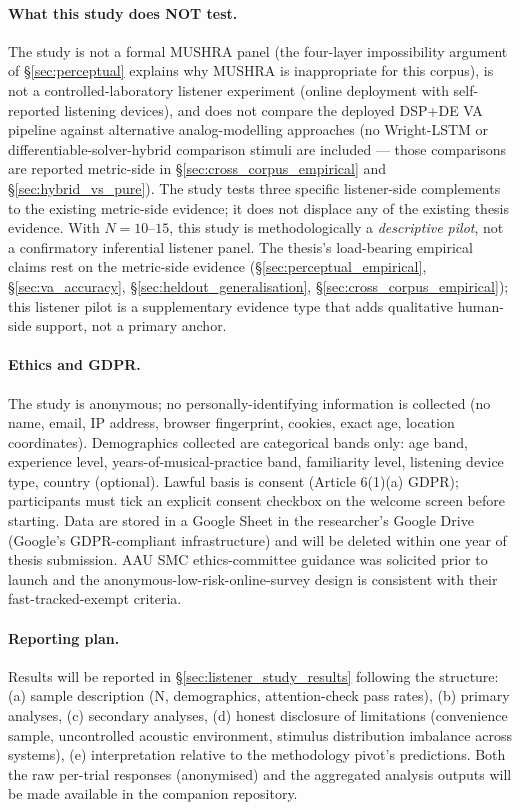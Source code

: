\paragraph{What this study does NOT test.} The study is not a formal MUSHRA panel (the four-layer impossibility argument of \S\ref{sec:perceptual} explains why MUSHRA is inappropriate for this corpus), is not a controlled-laboratory listener experiment (online deployment with self-reported listening devices), and does not compare the deployed DSP+DE VA pipeline against alternative analog-modelling approaches (no Wright-LSTM or differentiable-solver-hybrid comparison stimuli are included --- those comparisons are reported metric-side in \S\ref{sec:cross_corpus_empirical} and \S\ref{sec:hybrid_vs_pure}). The study tests three specific listener-side complements to the existing metric-side evidence; it does not displace any of the existing thesis evidence. With $N=10$--$15$, this study is methodologically a \emph{descriptive pilot}, not a confirmatory inferential listener panel. The thesis's load-bearing empirical claims rest on the metric-side evidence (\S\ref{sec:perceptual_empirical}, \S\ref{sec:va_accuracy}, \S\ref{sec:heldout_generalisation}, \S\ref{sec:cross_corpus_empirical}); this listener pilot is a supplementary evidence type that adds qualitative human-side support, not a primary anchor.

\paragraph{Ethics and GDPR.} The study is anonymous; no personally-identifying information is collected (no name, email, IP address, browser fingerprint, cookies, exact age, location coordinates). Demographics collected are categorical bands only: age band, experience level, years-of-musical-practice band, familiarity level, listening device type, country (optional). Lawful basis is consent (Article 6(1)(a) GDPR); participants must tick an explicit consent checkbox on the welcome screen before starting. Data are stored in a Google Sheet in the researcher's Google Drive (Google's GDPR-compliant infrastructure) and will be deleted within one year of thesis submission. AAU SMC ethics-committee guidance was solicited prior to launch and the anonymous-low-risk-online-survey design is consistent with their fast-tracked-exempt criteria.

\paragraph{Reporting plan.} Results will be reported in \S\ref{sec:listener_study_results} following the structure: (a) sample description (N, demographics, attention-check pass rates), (b) primary analyses, (c) secondary analyses, (d) honest disclosure of limitations (convenience sample, uncontrolled acoustic environment, stimulus distribution imbalance across systems), (e) interpretation relative to the methodology pivot's predictions. Both the raw per-trial responses (anonymised) and the aggregated analysis outputs will be made available in the companion repository.
